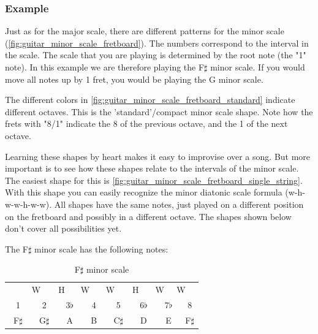 \newpage

\subsubsection{Example}

Just as for the major scale, there are different patterns for the minor scale (\autoref{fig:guitar_minor_scale_fretboard}). The numbers correspond to the interval in the scale. The scale that you are playing is determined by the root note (the "1" note). In this example we are therefore playing the F$\sharp$ minor scale. If you would move all notes up by 1 fret, you would be playing the G minor scale.

The different colors in \autoref{fig:guitar_minor_scale_fretboard_standard} indicate different octaves. This is the 'standard'/compact minor scale shape. Note how the frets with "8/1" indicate the 8 of the previous octave, and the 1 of the next octave.

Learning these shapes by heart makes it easy to improvise over a song. But more important is to see how these shapes relate to the intervals of the minor scale. The easiest shape for this is \autoref{fig:guitar_minor_scale_fretboard_single_string}. With this shape you can easily recognize the minor diatonic scale formula (w-h-w-w-h-w-w). All shapes have the same notes, just played on a different position on the fretboard and possibly in a different octave. The shapes shown below don't cover all possibilities yet.

The F$\sharp$ minor scale has the following notes:

\begin{table}[h]
	\centering
	\begin{tabular}{*{16}{c}}
		& \multicolumn{2}{P{4mm}}{\large{W}} & \multicolumn{2}{P{4mm}}{\large{H}} & \multicolumn{2}{P{4mm}}{\large{W}} & \multicolumn{2}{P{4mm}}{\large{W}} & \multicolumn{2}{P{4mm}}{\large{H}} & \multicolumn{2}{P{4mm}}{\large{W}} & \multicolumn{2}{P{4mm}}{\large{W}} & \\
		\multicolumn{2}{P{4mm}}{1} & \multicolumn{2}{P{4mm}}{2} & \multicolumn{2}{P{4mm}}{3$\flat$} & \multicolumn{2}{P{4mm}}{4} & \multicolumn{2}{P{4mm}}{5} & \multicolumn{2}{P{4mm}}{6$\flat$} & \multicolumn{2}{P{4mm}}{7$\flat$} & \multicolumn{2}{P{4mm}}{8} \\
		\multicolumn{2}{P{4mm}}{F$\sharp$} & \multicolumn{2}{P{4mm}}{G$\sharp$} & \multicolumn{2}{P{4mm}}{A} & \multicolumn{2}{P{4mm}}{B} & \multicolumn{2}{P{4mm}}{C$\sharp$} & \multicolumn{2}{P{4mm}}{D} & \multicolumn{2}{P{4mm}}{E} & \multicolumn{2}{P{4mm}}{F$\sharp$}
	\end{tabular}
	\caption{F$\sharp$ minor scale}
	\label{tab:guitar_f_sharp_minor_scale}
\end{table}

